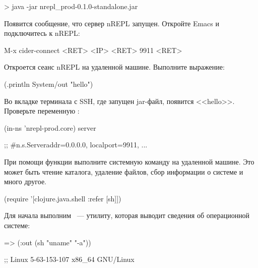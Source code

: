 \begin{english}
  \begin{bash}
> java -jar nrepl_prod-0.1.0-standalone.jar
  \end{bash}
\end{english}

Появится сообщение, что сервер nREPL запущен. Откройте Emacs и подключитесь к nREPL:

\begin{english}
  \begin{text}
M-x cider-connect <RET> <IP> <RET> 9911 <RET>
  \end{text}
\end{english}

Откроется сеанс nREPL на удаленной машине. Выполните выражение:

\begin{english}
  \begin{clojure}
(.println System/out "hello")
  \end{clojure}
\end{english}

Во вкладке терминала с SSH, где запущен jar-файл, появится <<hello>>. Проверьте переменную :

\begin{english}
  \begin{clojure}
(in-ns 'nrepl-prod.core)
server

;; #n.s.Server{addr=0.0.0.0, localport=9911, ...}
  \end{clojure}
\end{english}

При помощи функции  выполните системную команду на удаленной машине. Это может быть чтение каталога, удаление файлов, сбор информации о системе и много другое.

\begin{english}
  \begin{clojure}
(require '[clojure.java.shell :refer [sh]])
  \end{clojure}
\end{english}

Для начала выполним ~--- утилиту, которая выводит сведения об операционной системе:

\begin{english}
  \begin{clojure}
=> (:out (sh "uname" "-a"))

;; Linux 5-63-153-107 x86_64 GNU/Linux
  \end{clojure}
\end{english}

